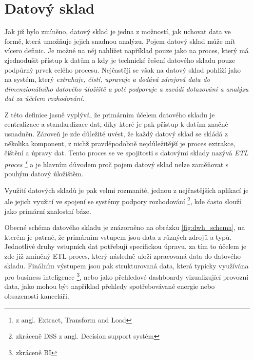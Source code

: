 \documentclass[
  digital,     %
  twoside,     %
  lof,         %
  lot,         %
]{fithesis4}
\begin{document}
\chapter{Datový sklad}
\label{dwh}
Jak již bylo zmíněno, datový sklad je jedna z možností, jak uchovat data ve formě, která umožňuje jejich snadnou analýzu. Pojem datový sklad může mít vícero definic. Je možné na něj nahlížet například pouze jako na proces, který má zjednodušit přístup k datům a kdy je technické řešení datového skladu pouze podpůrný prvek celého procesu. Nejčastěji se však na datový sklad pohlíží jako na systém, který \emph{extrahuje, čistí, upravuje a dodává zdrojová data do dimenzionálního datového úložiště a poté podporuje a zavádí dotazování a analýzu dat za účelem rozhodování.} \parencite[s.~23]{Kimballc2004}

Z této definice jasně vyplývá, že primárním účelem datového skladu je centralizace a standardizace dat, díky které je pak přístup k datům značně usnadněn. Zároveň je zde důležité uvést, že každý datový sklad se skládá z několika komponent, z nichž pravděpodobně nejdůležitější je proces extrakce, čištění a úpravy dat. Tento proces se ve spojitosti s datovými sklady nazývá \emph{ETL proces \footnote{z angl. Extract, Transform and Load} }a je hlavním důvodem proč pojem datový sklad nelze zaměňovat s pouhým datový úložištěm. \parencite[s.~24]{Kimballc2004}

Využití datových skladů je pak velmi rozmanité, jednou z nejčastějších aplikací je ale jejich využití ve spojení se systémy podpory rozhodování \footnote{zkráceně DSS z angl. Decision support
systém}, kde často slouží jako primární znalostní báze. \parencite[s.~2]{Inmon2005}

Obecné schéma datového skladu je znázorněno na obrázku \ref{fig:dwh_schema}, na kterém je patrné, že primárním vstupem jsou data z různých zdrojů a typů. Jednotlivé druhy vstupních dat potřebují specifickou úpravu, za tím to účelem je zde již zmíněný ETL proces, který následně uloží zpracovaná data do datového skladu. Finálním výstupem jsou pak strukturovaná data, která typicky využívána pro business inteligence \footnote{zkráceně BI}, nebo jako přehledové dashboardy vizualizující provozní data, jako mohou být například přehledy spotřebovávané energie nebo obsazenosti kanceláři.
\end{document}
